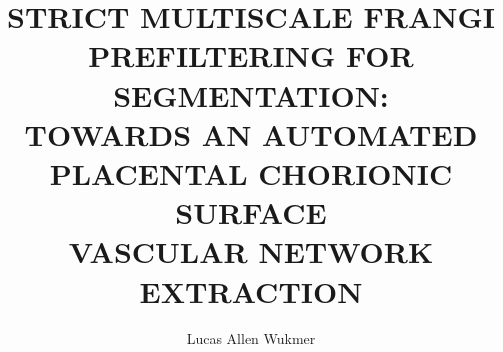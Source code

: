 \documentclass[12pt]{csulb-thesis-hier}
\author{Lucas Allen Wukmer}  					                %
\title{STRICT MULTISCALE FRANGI PREFILTERING FOR SEGMENTATION:\\
	     TOWARDS AN AUTOMATED PLACENTAL CHORIONIC SURFACE \\
       VASCULAR NETWORK EXTRACTION}
\theoremstyle{defths}
\begin{document}
\begin{preliminary}



\maketitle

\begin{abstract}
	
\end{abstract}

\begin{acknowledgements}

\end{acknowledgements}

\setcounter{tocdepth}{0}  %
\dominitoc
\tableofcontents

\setcounter{tocdepth}{1}
\listoftables

\listoffigures

\end{preliminary}

\clearpage 
{}	%

		





%

%


%

\end{document}
